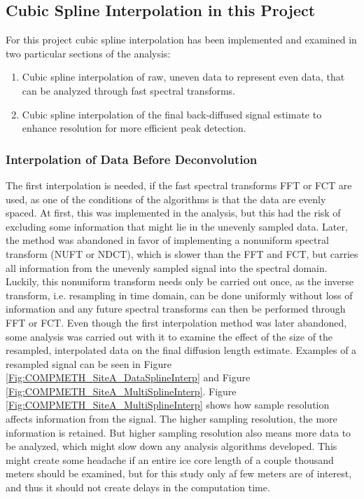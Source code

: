 \documentclass[../../CompleteThesis/Complete_1stDraft.tex]{subfiles}
\begin{document}
	\subsection[Interpolation in this Project][Interpolation in this Project]{Cubic Spline Interpolation in this Project}
	\label{Subsec:CompMeths_SplinesAndInterpolation_InterpolationInThisProj}
	For this project cubic spline interpolation has been implemented and examined in two particular sections of the analysis: 
	\begin{enumerate}
		\item Cubic spline interpolation of raw, uneven data to represent even data, that can be analyzed through fast spectral transforms.
		\item Cubic spline interpolation of the final back-diffused signal estimate to enhance resolution for more efficient peak detection.
	\end{enumerate}
	
	\subsubsection[Interpolation 1]{Interpolation of Data Before Deconvolution}
	\label{Subsubsec:CompMethod_StabilityTests_Interpolation1}
	
	The first interpolation is needed, if the fast spectral transforms FFT or FCT are used, as one of the conditions of the algorithms is that the data are evenly spaced. At first, this was implemented in the analysis, but this had the risk of excluding some information that might lie in the unevenly sampled data. Later, the method was abandoned in favor of implementing a nonuniform spectral transform (NUFT or NDCT), which is slower than the FFT and FCT, but carries all information from the unevenly sampled signal into the spectral domain. Luckily, this nonuniform transform needs only be carried out once, as the inverse transform, i.e. resampling in time domain, can be done uniformly without loss of information and any future spectral transforms can then be performed through FFT or FCT.
	Even though the first interpolation method was later abandoned, some analysis was carried out with it to examine the effect of the size of the resampled, interpolated data on the final diffusion length estimate. Examples of a resampled signal can be seen in Figure \ref{Fig:COMPMETH_SiteA_DataSplineInterp} and Figure \ref{Fig:COMPMETH_SiteA_MultiSplineInterp}. Figure \ref{Fig:COMPMETH_SiteA_MultiSplineInterp} shows how sample resolution affects information from the signal. The higher sampling resolution, the more information is retained. But higher sampling resolution also means more data to be analyzed, which might slow down any analysis algorithms developed. This might create some headache if an entire ice core length of a couple thousand meters should be examined, but for this study only af few meters are of interest, and thus it should not create delays in the computation time.
	
\end{document}
